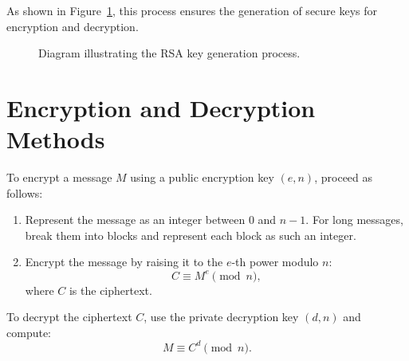 \documentclass[12pt,a4paper]{report}
\begin{document}
As shown in Figure~\ref{fig:key_generation}, this process ensures the generation of secure keys for encryption and decryption.

\begin{figure}[ht!]
    \centering
    \caption[Key Generation]{Diagram illustrating the RSA key generation process.}%
    \label{fig:key_generation}
\end{figure}

\section{Encryption and Decryption Methods}
To encrypt a message \( M \) using a public encryption key \((e, n)\), proceed as follows:
\begin{enumerate}
    \item Represent the message as an integer between \( 0 \) and \( n-1 \). For long messages, break them into blocks and represent each block as such an integer.
    \item Encrypt the message by raising it to the \( e \)-th power modulo \( n \):
    \[
    C \equiv M^e \pmod{n},
    \]
    where \( C \) is the ciphertext.
\end{enumerate}

To decrypt the ciphertext \( C \), use the private decryption key \((d, n)\) and compute:
\[
M \equiv C^d \pmod{n}.
\]
\end{document}
